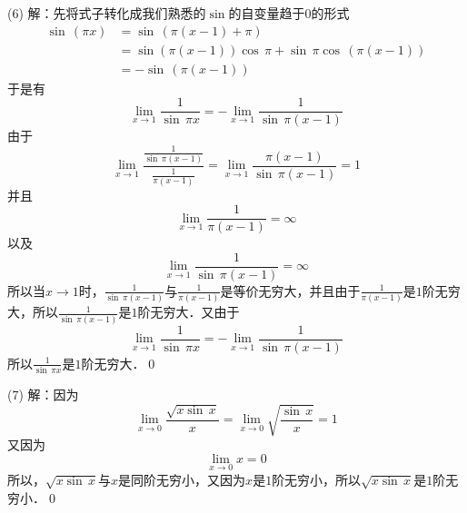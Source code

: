 \medskip
(6) 解：先将式子转化成我们熟悉的$\sin$的自变量趋于$0$的形式
\begin{align}
    \sin \, \left(\pi x\right) &= \sin \, \left(\pi(x-1)+\pi\right) \\
    &= \sin \left(\pi \left(x-1\right) \right) \cos \, \pi + \sin \, \pi \cos \, \left(\pi \left(x-1\right)\right) \\
    &= - \sin \, \left(\pi\left(x-1\right)\right)
\end{align}
于是有
\begin{equation}
    \lim_{x \to 1} \frac{1}{\sin \, \pi x} = -\lim_{x \to 1} \frac{1}{\sin \, \pi \left(x-1\right)}
\end{equation}
由于
\begin{equation}
    \lim_{x \to 1} \displaystyle\frac{\displaystyle\frac{1}{\sin \, \pi \left(x-1\right)}}{\displaystyle\frac{1}{\pi \left(x-1\right)}} = \lim_{x \to 1} \frac{\pi \left(x-1\right)}{\sin \, \pi \left(x-1\right)} = 1
\end{equation}
并且
\begin{equation}
    \lim_{x \to 1} \frac{1}{\pi \left(x-1\right)} = \infty
\end{equation}
以及
\begin{equation}
    \lim_{x \to 1} \frac{1}{\sin \, \pi \left(x-1\right)} = \infty
\end{equation}
所以当$x \to 1$时，$\displaystyle\frac{1}{\sin \, \pi \left(x-1\right)}$与$\displaystyle\frac{1}{\pi \left(x-1\right)}$是等价无穷大，并且由于$\displaystyle\frac{1}{\pi \left(x-1\right)}$是$1$阶无穷大，所以$\displaystyle\frac{1}{\sin \, \pi \left(x-1\right)}$是$1$阶无穷大．又由于
\begin{equation}
    \lim_{x \to 1} \frac{1}{\sin \, \pi x} = - \lim_{x \to 1} \frac{1}{\sin \, \pi \left(x-1\right)} 
\end{equation}
所以$\displaystyle\frac{1}{\sin \, \pi x}$是$1$阶无穷大．\qed

\medskip
(7) 解：因为
\begin{equation}
    \lim_{x \to 0} \frac{\sqrt{x \sin \, x}}{x} = \lim_{x \to 0} \displaystyle\sqrt{\displaystyle\frac{\sin \, x}{x}} = 1
\end{equation}
又因为
\begin{equation}
    \lim_{x \to 0} x = 0
\end{equation}
所以，$\displaystyle\sqrt{x \sin \, x}$与$x$是同阶无穷小，又因为$x$是$1$阶无穷小，所以$\displaystyle\sqrt{x \sin \, x}$是$1$阶无穷小．\qed

